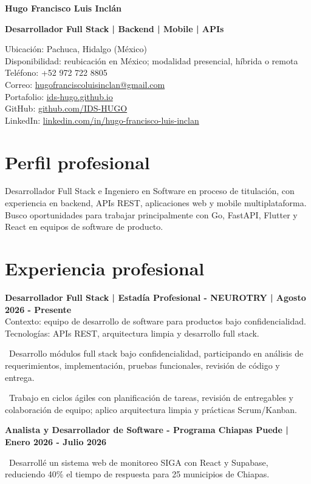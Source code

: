 \documentclass[9pt,letterpaper]{article}
\newcommand{\cvbullet}[1]{\par\noindent\textbullet\ #1\par}
\begin{document}
\small

{\Huge\bfseries Hugo Francisco Luis Inclán}\par
\vspace{2pt}
{\large\bfseries Desarrollador Full Stack | Backend | Mobile | APIs}\par
\vspace{4pt}
Ubicación: Pachuca, Hidalgo (México)\\
Disponibilidad: reubicación en México; modalidad presencial, híbrida o remota\\
Teléfono: +52 972 722 8805\\
Correo: \href{mailto:hugofranciscoluisinclan@gmail.com}{hugofranciscoluisinclan@gmail.com}\\
Portafolio: \href{https://ids-hugo.github.io}{ids-hugo.github.io}\\
GitHub: \href{https://github.com/IDS-HUGO}{github.com/IDS-HUGO}\\
LinkedIn: \href{https://linkedin.com/in/hugo-francisco-luis-inclan-3aaa752a1}{linkedin.com/in/hugo-francisco-luis-inclan}

\section*{Perfil profesional}
Desarrollador Full Stack e Ingeniero en Software en proceso de titulación, con experiencia en backend, APIs REST, aplicaciones web y mobile multiplataforma. Busco oportunidades para trabajar principalmente con Go, FastAPI, Flutter y React en equipos de software de producto.

\section*{Experiencia profesional}
\textbf{Desarrollador Full Stack | Estadía Profesional - NEUROTRY | Agosto 2026 - Presente}\\
Contexto: equipo de desarrollo de software para productos bajo confidencialidad. Tecnologías: APIs REST, arquitectura limpia y desarrollo full stack.
\cvbullet{Desarrollo módulos full stack bajo confidencialidad, participando en análisis de requerimientos, implementación, pruebas funcionales, revisión de código y entrega.}
\cvbullet{Trabajo en ciclos ágiles con planificación de tareas, revisión de entregables y colaboración de equipo; aplico arquitectura limpia y prácticas Scrum/Kanban.}

\textbf{Analista y Desarrollador de Software - Programa Chiapas Puede | Enero 2026 - Julio 2026}\\
\cvbullet{Desarrollé un sistema web de monitoreo SIGA con React y Supabase, reduciendo 40\% el tiempo de respuesta para 25 municipios de Chiapas.}
\end{document}
